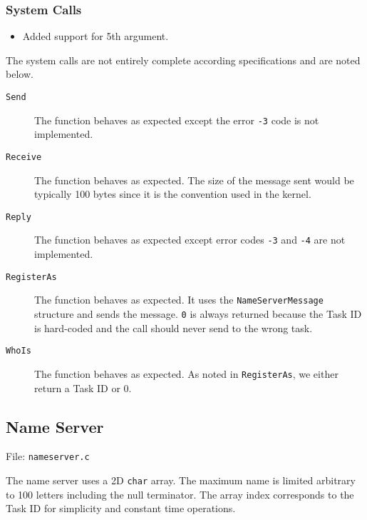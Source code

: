 \documentclass[letterpaper, 12pt]{article}
\begin{document}
\subsubsection{System Calls%
  \label{system-calls}%
}
%
\begin{itemize}

\item Added support for 5th argument.

\end{itemize}

The system calls are not entirely complete according specifications and are noted below.
%
\begin{description}
\item[{\texttt{Send}}] \leavevmode 
The function behaves as expected except the error \texttt{-3} code is not implemented.

\item[{\texttt{Receive}}] \leavevmode 
The function behaves as expected. The size of the message sent would be typically 100 bytes since it is the convention used in the kernel.

\item[{\texttt{Reply}}] \leavevmode 
The function behaves as expected except error codes \texttt{-3} and \texttt{-4} are not implemented.

\item[{\texttt{RegisterAs}}] \leavevmode 
The function behaves as expected. It uses the \texttt{NameServerMessage} structure and sends the message. \texttt{0} is always returned because the Task ID is hard-coded and the call should never send to the wrong task.

\item[{\texttt{WhoIs}}] \leavevmode 
The function behaves as expected. As noted in \texttt{RegisterAs}, we either return a Task ID or 0.

\end{description}


\subsection{Name Server%
  \label{name-server}%
}

File: \texttt{nameserver.c}

The name server uses a 2D \texttt{char} array. The maximum name is limited arbitrary to 100 letters including the null terminator. The array index corresponds to the Task ID for simplicity and constant time operations.
\end{document}
